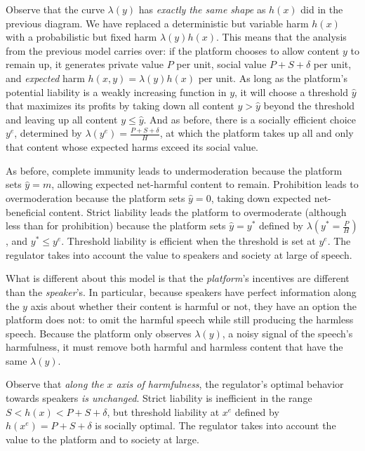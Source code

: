 Observe that the curve $\lambda(y)$ has \emph{exactly the same shape} as $h(x)$ did in the previous diagram. We have replaced a deterministic but variable harm $h(x)$ with a probabilistic but fixed harm $\lambda(y)h(x)$. This means that the analysis from the previous model carries over: if the platform chooses to allow content $y$ to remain up, it generates private value $P$ per unit, social value $P+S+\delta$ per unit, and \emph{expected} harm $h(x,y) = \lambda(y)h(x)$ per unit. As long as the platform's potential liability is a weakly increasing function in $y$, it will choose a threshold $\hat{y}$ that maximizes its profits by taking down all content $y > \hat{y}$ beyond the threshold and leaving up all content $y \le \hat{y}$. And as before, there is a socially efficient choice $y^e$, determined by $\lambda(y^e) = \frac{P + S+ \delta}{H}$, at which the platform takes up all and only that content whose expected harms exceed its social value. 

As before, complete immunity leads to undermoderation because the platform sets $\hat{y} = m$, allowing expected net-harmful content to remain. Prohibition leads to overmoderation because the platform sets $\hat{y} = 0$, taking down expected net-beneficial content. Strict liability leads the platform to overmoderate (although less than for prohibition) because the platform sets $\hat{y} = y^{\ast}$ defined by $\lambda(y^{\ast} = \frac{P}{H})$, and $y^{\ast} \le y^e$. Threshold liability is efficient when the threshold is set at $y^e$. The regulator takes into account the value to speakers and society at large of speech.

What is different about this model is that the \emph{platform}'s incentives are different than the \emph{speaker}'s. In particular, because speakers have perfect information along the $y$ axis about whether their content is harmful or not, they have an option the platform does not: to omit the harmful speech while still producing the harmless speech. Because the platform only observes $\lambda(y)$, a noisy signal of the speech's harmfulness, it must remove both harmful and harmless content that have the same $\lambda(y)$.

Observe that \emph{along the $x$ axis of harmfulness}, the regulator's optimal behavior towards speakers \emph{is unchanged}. Strict liability is inefficient in the range $S < h(x) < P + S + \delta$, but threshold liability at $x^e$ defined by $h(x^e) = P + S + \delta$ is socially optimal. The regulator takes into account the value to the platform and to society at large.

